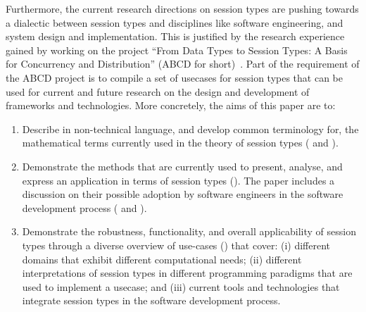 Furthermore, the current research directions on session types are
pushing towards a dialectic between session types and disciplines
like software engineering, and system design and implementation.
This is justified by the research experience gained by working
on the project
``From Data Types to Session Types: A Basis for Concurrency and Distribution''
(ABCD for short)~\cite{ABCD}.
Part of the requirement of the ABCD project is to compile a set of usecases
for session types that can be used for current and future research on
the design and development of frameworks and technologies.
%
More concretely, the aims of this paper are to:
%
\begin{enumerate}
	\item	Describe in non-technical language, and develop common terminology
			for, the mathematical terms currently used in the theory of
			session types ( and ).

	\item	Demonstrate the methods that are currently used to present,
			analyse, and express an application in terms of session types
			().
			The paper includes a discussion on their possible adoption by
			software engineers in the software development process
			( and ).


	\item	Demonstrate the robustness, functionality, and overall applicability
			of session types through a diverse overview of use-cases ()
			that cover:
			(i) different domains that exhibit different computational needs;
			(ii) different interpretations of session types in different
			programming paradigms that are used to implement a usecase; and
			(iii) current tools and technologies that integrate session types
			in the software development process.
%
%
%
%


\end{enumerate}
